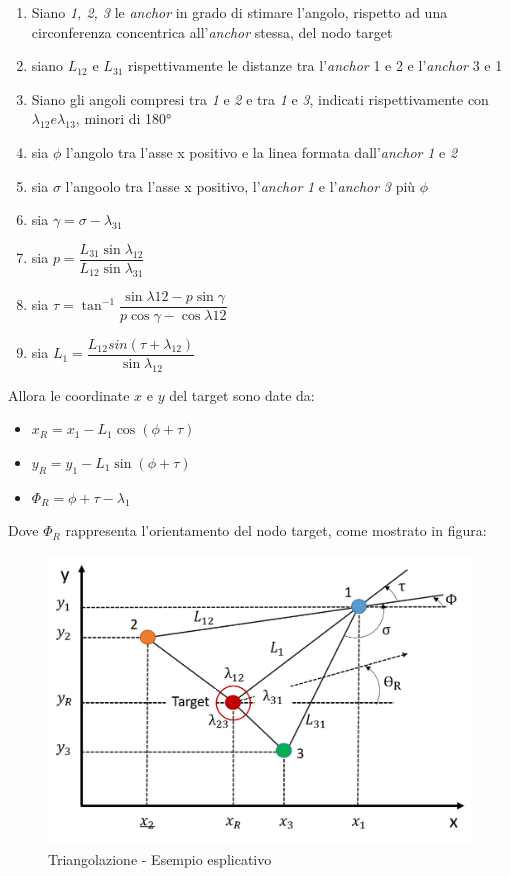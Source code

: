 \begin{enumerate}
   \item Siano \textit{1, 2, 3} le \textit{anchor} in grado di stimare l'angolo, rispetto ad una circonferenza concentrica all'\textit{anchor} stessa, del nodo target
   \item siano $L_{12}$ e $L_{31}$ rispettivamente le distanze tra l'\textit{anchor} 1 e 2 e l'\textit{anchor} 3 e 1
   \item Siano gli angoli compresi tra \textit{1} e \textit{2} e tra \textit{1} e \textit{3}, indicati rispettivamente con $\lambda_{12} e \lambda_{13}$, minori di 180°
   \item sia $\phi$ l'angolo tra l'asse x positivo e la linea formata dall'\textit{anchor} \textit{1} e \textit{2}
   \item sia $\sigma$ l'angoolo tra l'asse x positivo, l'\textit{anchor} \textit{1} e l'\textit{anchor} \textit{3} più $\phi$
   \item sia $\gamma= \sigma - \lambda_{31}$
   \item sia $p= \dfrac{L_{31} \sin\lambda_{12}}{L_{12} \sin\lambda_{31}}$
   \item sia $\tau= \tan^{-1} \dfrac{\sin\lambda{12}-p \sin\gamma}{p \cos\gamma-\cos\lambda{12}}$
   \item sia $L_1 = \dfrac{L_{12} sin(\tau+\lambda_{12})}{\sin\lambda_{12}}$
\end{enumerate}

Allora le coordinate $x$ e $y$ del target sono date da:
\begin{itemize}
	\item $x_R = x_1 - L_1  \cos(\phi + \tau)$
	\item $y_R = y_1 - L_1  \sin(\phi + \tau)$
	\item $\Phi_R = \phi + \tau - \lambda_1$
\end{itemize}
Dove $\Phi_R$ rappresenta l'orientamento del nodo target, come mostrato in figura:


\begin{figure}[H]  
	\centering 
	\includegraphics[scale=0.4]{ContestoApplicativo/triangolazione.png}
	\caption{Triangolazione - Esempio esplicativo}
	\label{fig:triangolazione}
\end{figure}






